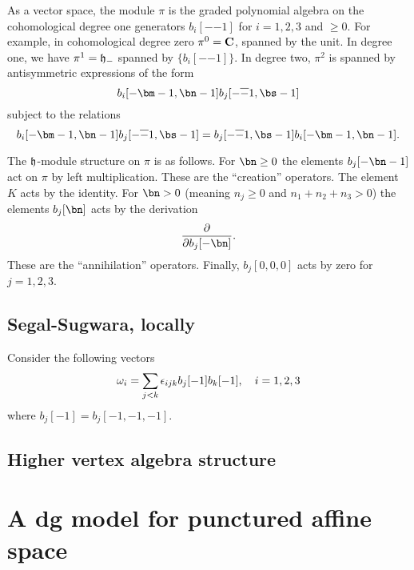 \documentclass[11pt]{amsart}
\begin{document}
As a vector space, the module $\pi$ is the graded polynomial algebra on the cohomological degree one generators $b_{i}[-\bm-1]$ for $i=1,2,3$ and $\bm \geq 0$.
For example, in cohomological degree zero $\pi^{0} = \mathbf{C}$, spanned by the unit.
In degree one, we have $\pi^{1}=\mathfrak{h}_{-}$ spanned by $\{b_{i}[-\bm-1]\}$.
In degree two, $\pi^{2}$ is spanned by antisymmetric expressions of the form
\begin{equation}\label{eqn:deg2}
b_{i}[-\bm-1,\bn-1] b_{j}[-\br-1,\bs-1]
\end{equation}
subject to the relations
\begin{equation}\label{}
b_{i}[-\bm-1,\bn-1] b_{j}[-\br-1,\bs-1] = b_{j}[-\br-1,\bs-1] b_{i}[-\bm-1,\bn-1]  .
\end{equation}

The $\mathfrak{h}$-module structure on $\pi$ is as follows.
For $\bn \geq 0$ the elements $b_{j}[-\bn-1]$ act on $\pi$ by left multiplication.
These are the ``creation'' operators.
The element $K$ acts by the identity.
For $\bn > 0$ (meaning $n_{j} \geq 0$ and $n_{1}+n_{2}+n_{3} > 0$) the elements $b_{j}[\bn]$ acts by the derivation\begin{equation}\label{eqn:derivationexplicit}
  \frac{\del}{\del b_{j}[-\bn]}.
\end{equation}
These are the ``annihilation'' operators.
Finally, $b_{j}[0,0,0]$ acts by zero for $j=1,2,3$.


\subsection{Segal-Sugwara, locally}

Consider the following vectors
\begin{equation}\label{}
\omega_{i} = \sum_{j<k} {\epsilon}_{ijk} b_{j}[-1] b_{k}[-1] , \quad i=1,2,3
\end{equation}
where $b_{j}[-1] = b_{j}[-1,-1,-1]$.

\subsection{Higher vertex algebra structure}


\newpage

\appendix

\section{A dg model for punctured affine space} \label{appx:A}
\end{document}
